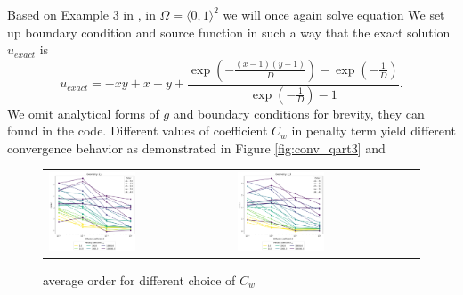 \begin{example}
\label{ex:quart3}
Based on Example 3 in \cite{Antonietti2013},
in $\Omega = \langle 0, 1 \rangle^2$ we will once again solve equation
We set up boundary condition and source function in such a way that the exact 
solution $u_{exact}$ is
\begin{equation}
	u_{exact} = -xy + x +y + \frac{\exp{\left(-\frac{{\left(x - 1\right)} {\left(y - 
	1\right)}}{D}\right)} - 
	\exp{\left(-\frac{1}{D}\right)}}{\exp{\left(-\frac{1}{D}\right)} 
	- 1}.
\end{equation}
We omit analytical forms of $g$ and boundary conditions for brevity, they can found in 
the code. Different values of 
coefficient $C_w$ in penalty term yield different convergence behavior as 
demonstrated in Figure 
\ref{fig:conv_qart3} and 
\end{example}

\begin{figure}[h!]
	\centering
	\begin{tabular}{p{} p{}}
	\vspace{0pt} 
	\includegraphics[width=0.49\textwidth]{../figs/parametric/advdiff_2D/ord_quarteroni2_2_4}
	&
	\vspace{0pt} 
	\includegraphics[width=0.49\textwidth]{../figs/parametric/advdiff_2D/ord_quarteroni2_2_3}
	\end{tabular}
	\caption{ average order for different choice of $C_w$}
	\label{fig:orders_quarteroni3}
\end{figure}


